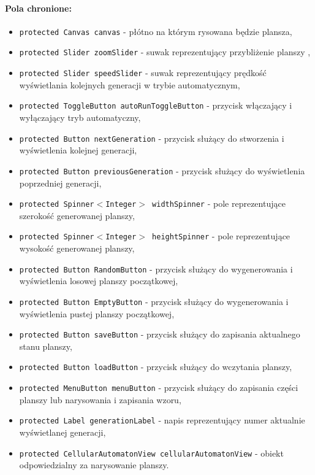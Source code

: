 \documentclass{report}
\begin{document}
\paragraph{Pola chronione:}
\begin{itemize}
	\item \texttt{protected Canvas canvas} - płótno na którym rysowana będzie plansza,
	\item \texttt{protected Slider zoomSlider} - suwak reprezentujący przybliżenie planszy \label{sec:zoomSlider},
	\item \texttt{protected Slider speedSlider} - suwak reprezentujący prędkość wyświetlania kolejnych generacji w trybie automatycznym\label{sec:speedSlider},
	\item \texttt{protected ToggleButton autoRunToggleButton} - przycisk włączający i wyłączający tryb automatyczny,
	\item \texttt{protected Button nextGeneration} - przycisk służący do stworzenia i wyświetlenia kolejnej generacji,
	\item \texttt{protected Button previousGeneration}  - przycisk służący do  wyświetlenia poprzedniej generacji,
	\item \texttt{protected Spinner$<$Integer$>$  widthSpinner} - pole reprezentujące szerokość generowanej planszy,
	\item \texttt{protected Spinner$<$Integer$>$ heightSpinner} - pole reprezentujące wysokość generowanej planszy,
	\item \texttt{protected Button RandomButton} - przycisk służący do wygenerowania i wyświetlenia losowej planszy początkowej,
	\item \texttt{protected Button EmptyButton} - przycisk służący do wygenerowania i wyświetlenia pustej planszy początkowej,
	\item \texttt{protected Button saveButton} - przycisk służący do zapisania aktualnego stanu planszy,
	\item \texttt{protected Button loadButton} - przycisk służący do wczytania planszy,
	\item \texttt{protected MenuButton menuButton} - przycisk służący do zapisania części planszy lub narysowania i zapisania wzoru,
	\item \texttt{protected Label generationLabel} -  napis reprezentujący numer aktualnie wyświetlanej generacji,
	\item \texttt{protected CellularAutomatonView cellularAutomatonView} - obiekt odpowiedzialny za narysowanie planszy.
\end{itemize}
\end{document}
